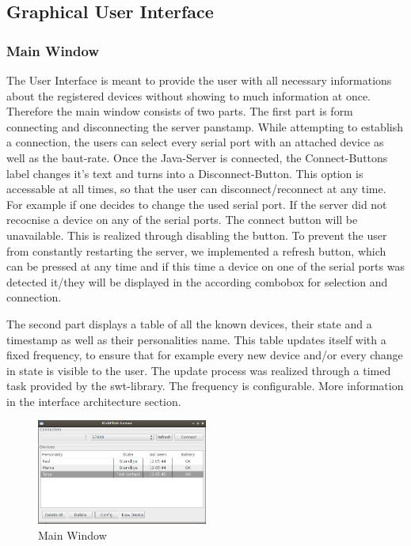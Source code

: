 \subsection{Graphical User Interface}
\subsubsection{Main Window}
The User Interface is meant to provide the user with all necessary informations about the registered devices without showing to much information at once. Therefore the main window consists of two parts. 
The first part is form connecting and disconnecting the server panstamp. While attempting to establish a connection, the users can select every serial port with an attached device as well as the baut-rate. Once the Java-Server is connected, the Connect-Buttons label changes it's text and turns into a Disconnect-Button. This option is accessable at all times, so that the user can disconnect/reconnect at any time. For example if one decides to change the used serial port. 
If the server did not recocnise a device on any of the serial ports. The connect button will be unavailable. This is realized through disabling the button. To prevent the user from constantly restarting the server, we implemented a refresh button, which can be pressed at any time and if this time a device on one of the serial ports was detected it/they will be displayed in the according combobox for selection and connection.


The second part displays a table of all the known devices, their state and a timestamp as well as their personalities name. This table updates itself with a fixed frequency, to ensure that for example every new device and/or every change in state is visible to the user. The update process was realized through a timed task provided by the swt-library. The frequency is configurable. More information in the interface architecture section. %

\begin{figure}[h!]
 \centering
 \includegraphics[width= 0.5\textwidth, clip=true  ,keepaspectratio=true]{./pic/java-server-main.png}
 \caption{Main Window}
 \label{fig:java-server-main}
\end{figure}



